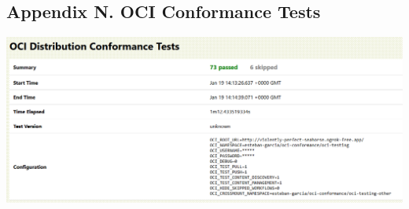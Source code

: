 \documentclass{article}
\begin{document}
  \subsection{Appendix N. OCI Conformance Tests}
  \label{sec:appendix-n}

  \includegraphics[scale=0.45]{appendix/oci-comformance-test.png}
\end{document}
